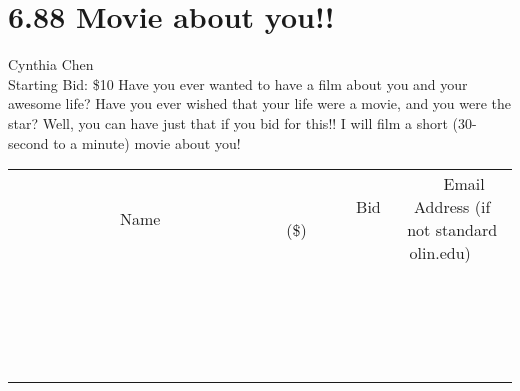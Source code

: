 \documentclass[11pt]{article}
\begin{document}
\section*{6.88 Movie about you!! }
Cynthia Chen
\\
Starting Bid: \$10
\newline
Have you ever wanted to have a film about you and your awesome life? Have you ever wished that your life were a movie, and you were the star? Well, you can have just that if you bid for this!! I will film a short (30-second to a minute) movie about you!
\\[3ex]
\begin{tabular}{c c c}
~~~~~~~~~~~~~Name~~~~~~~~~~~~~ & ~~~~~~~~~Bid (\$)~~~~~~~~~  & ~~~Email Address (if not standard olin.edu)~~~\\
 & & \\
\hline
 & & \\
\hline
 & & \\
\hline
 & & \\
\hline
 & & \\
\hline
 & & \\
\hline
 & & \\
\hline
 & & \\
\hline
 & & \\
\hline
 & & \\
\hline
 & & \\
\hline
 & & \\
\hline
 & & \\
\hline
 & & \\
\hline
 & & \\
\hline
 & & \\
\hline
 & & \\
\hline
 & & \\
\hline
 & & \\
\hline
\end{tabular}
\newpage
\end{document}
